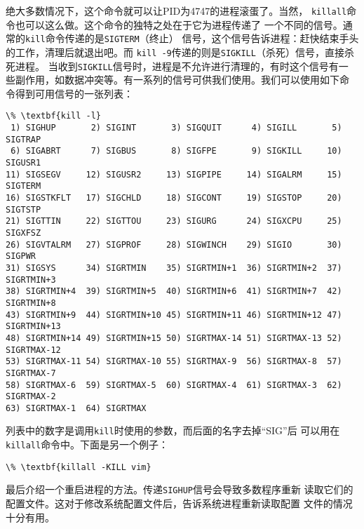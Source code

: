 绝大多数情况下，这个命令就可以让PID为4747的进程滚蛋了。当然，
\texttt{killall}命令也可以这么做。这个命令的独特之处在于它为进程传递了
一个不同的信号。通常的\texttt{kill}命令传递的是\texttt{SIGTERM}（终止）
信号，这个信号告诉进程：赶快结束手头的工作，清理后就退出吧。而
\texttt{kill -9}传递的则是\texttt{SIGKILL}（杀死）信号，直接杀死进程。
当收到\texttt{SIGKILL}信号时，进程是不允许进行清理的，有时这个信号有一
些副作用，如数据冲突等。有一系列的信号可供我们使用。我们可以使用如下命
令得到可用信号的一张列表：
\begin{Verbatim}[frame=single, commandchars=\\\{\}]
\% \textbf{kill -l}
 1) SIGHUP       2) SIGINT       3) SIGQUIT      4) SIGILL       5) SIGTRAP
 6) SIGABRT      7) SIGBUS       8) SIGFPE       9) SIGKILL     10) SIGUSR1
11) SIGSEGV     12) SIGUSR2     13) SIGPIPE     14) SIGALRM     15) SIGTERM
16) SIGSTKFLT   17) SIGCHLD     18) SIGCONT     19) SIGSTOP     20) SIGTSTP
21) SIGTTIN     22) SIGTTOU     23) SIGURG      24) SIGXCPU     25) SIGXFSZ
26) SIGVTALRM   27) SIGPROF     28) SIGWINCH    29) SIGIO       30) SIGPWR
31) SIGSYS      34) SIGRTMIN    35) SIGRTMIN+1  36) SIGRTMIN+2  37) SIGRTMIN+3
38) SIGRTMIN+4  39) SIGRTMIN+5  40) SIGRTMIN+6  41) SIGRTMIN+7  42) SIGRTMIN+8
43) SIGRTMIN+9  44) SIGRTMIN+10 45) SIGRTMIN+11 46) SIGRTMIN+12 47) SIGRTMIN+13
48) SIGRTMIN+14 49) SIGRTMIN+15 50) SIGRTMAX-14 51) SIGRTMAX-13 52) SIGRTMAX-12
53) SIGRTMAX-11 54) SIGRTMAX-10 55) SIGRTMAX-9  56) SIGRTMAX-8  57) SIGRTMAX-7
58) SIGRTMAX-6  59) SIGRTMAX-5  60) SIGRTMAX-4  61) SIGRTMAX-3  62) SIGRTMAX-2
63) SIGRTMAX-1  64) SIGRTMAX
\end{Verbatim}
列表中的数字是调用\texttt{kill}时使用的参数，而后面的名字去掉``SIG''后
可以用在\texttt{killall}命令中。下面是另一个例子：
\begin{Verbatim}[frame=single, commandchars=\\\{\}]
\% \textbf{killall -KILL vim}
\end{Verbatim}

最后介绍一个重启进程的方法。传递\texttt{SIGHUP}信号会导致多数程序重新
读取它们的配置文件。这对于修改系统配置文件后，告诉系统进程重新读取配置
文件的情况十分有用。

